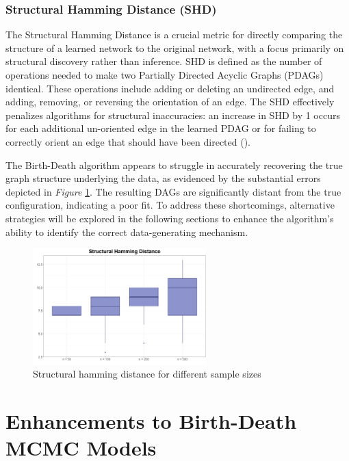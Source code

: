 \documentclass{report}
\begin{document}
\subsection{Structural Hamming Distance (SHD)}

The Structural Hamming Distance is a crucial metric for directly comparing the structure of a learned network to the original network, with a focus primarily on structural discovery rather than inference. SHD is defined as the number of operations needed to make two Partially Directed Acyclic Graphs (PDAGs) identical. These operations include adding or deleting an undirected edge, and adding, removing, or reversing the orientation of an edge. The SHD effectively penalizes algorithms for structural inaccuracies: an increase in SHD by 1 occurs for each additional un-oriented edge in the learned PDAG or for failing to correctly orient an edge that should have been directed (\citet{tsamardinos2006max}).

The Birth-Death algorithm appears to struggle in accurately recovering the true graph structure underlying the data, as evidenced by the substantial errors depicted in \textit{Figure}  \ref{fig:box-shd-bd}. The resulting DAGs are significantly distant from the true configuration, indicating a poor fit. To address these shortcomings, alternative strategies will be explored in the following sections to enhance the algorithm's ability to identify the correct data-generating mechanism.

\begin{figure}[h] 
	\centering
	\includegraphics[width=0.6\textwidth]{Figures/Overall_comparison/Boxplot_shd_original.png}
	\caption{Structural hamming distance for different sample sizes}
	\label{fig:box-shd-bd}
\end{figure}

\chapter{Enhancements to Birth-Death MCMC Models}
\end{document}
